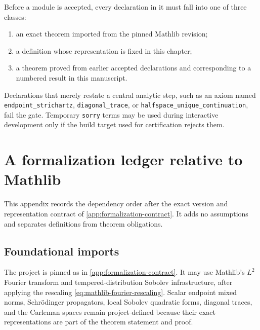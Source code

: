 \documentclass[11pt,oneside]{book}
\theoremstyle{definition}
\theoremstyle{remark}
\newcommand{\1}{\mathbf 1}
\begin{document}
Before a module is accepted, every declaration in it must fall into one of
three classes:
\begin{enumerate}
\item an exact theorem imported from the pinned Mathlib revision;
\item a definition whose representation is fixed in this chapter;
\item a theorem proved from earlier accepted declarations and corresponding
to a numbered result in this manuscript.
\end{enumerate}
Declarations that merely restate a central analytic step, such as an axiom
named \texttt{endpoint\_strichartz}, \texttt{diagonal\_trace}, or
\texttt{halfspace\_unique\_continuation}, fail the gate.  Temporary
\texttt{sorry} terms may be used during interactive development only if the
build target used for certification rejects them.

\chapter{A formalization ledger relative to Mathlib}\label{app:ledger}

This appendix records the dependency order after the exact version and
representation contract of \cref{app:formalization-contract}.  It adds no
assumptions and separates definitions from theorem obligations.

\section{Foundational imports}
The project is pinned as in \cref{app:formalization-contract}.  It may use
Mathlib's $L^2$ Fourier transform and tempered-distribution Sobolev
infrastructure, after applying the rescaling
\eqref{eq:mathlib-fourier-rescaling}.  Scalar endpoint mixed norms,
Schr\"odinger propagators, local Sobolev quadratic forms, diagonal traces,
and the Carleman spaces remain project-defined because their exact
representations are part of the theorem statement and proof.
\end{document}

